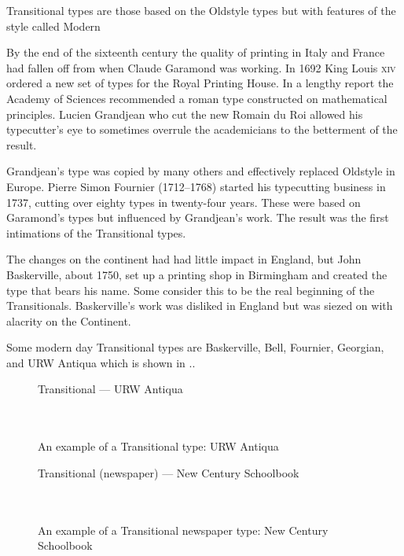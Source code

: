\documentclass[10pt,letterpaper,extrafontsizes]{memoir}
\begin{document}
    Transitional types are those based on the Oldstyle 
types but with features of the style called Modern 

    By the end of the sixteenth century the quality of printing in Italy 
and France had fallen off from when Claude Garamond 
was working. In 1692
King Louis \textsc{xiv} ordered a new set of types for the Royal Printing
House. In a lengthy report the Academy of Sciences recommended a roman type
constructed on mathematical principles. 
Lucien Grandjean who cut the
new Romain du Roi allowed his typecutter's eye to 
sometimes overrule the 
academicians to the betterment of the result.

    Grandjean's type was copied by many others and effectively replaced 
Oldstyle in Europe. Pierre Simon Fournier 
(1712--1768) started his typecutting 
business in 1737, cutting over eighty types in twenty-four years. These were
based on Garamond's types but influenced by Grandjean's work. The result was
the first intimations of the Transitional types.

    The changes on the continent had had little impact in England, but John
Baskerville, about 1750, set up a printing shop 
in Birmingham and created the type that bears his name. Some consider this
to be the real beginning of the Transitionals. Baskerville's work was
disliked in England but was siezed on with alacrity on the Continent.

    Some modern day Transitional types are 
Baskerville, 
Bell, 
Fournier,
Georgian,
and URW Antiqua which is shown in .. 

\begin{figure}
\centering
{\centering{}\selectfont
  Transitional --- URW Antiqua \\
  \UCalphabet \\
  \LCalphabet \\
  \fox\par}
\caption{An example of a Transitional type: URW Antiqua} 
   \label{fig:antiqua}
\end{figure}

\begin{figure}
\centering
{\centering{}\selectfont
  Transitional (newspaper) --- New Century Schoolbook \\
  \UCalphabet \\
  \LCalphabet \\
  \fox\par}
\caption{An example of a Transitional newspaper type: New Century Schoolbook} 
   \label{fig:newcent}
\end{figure}
\end{document}
